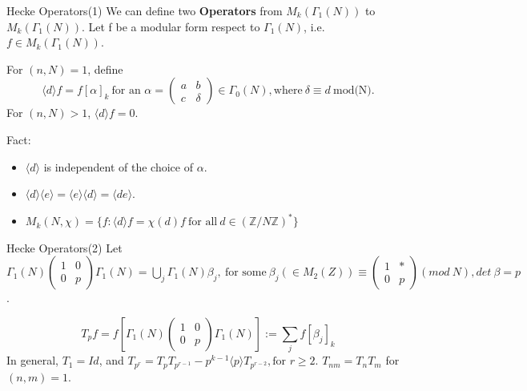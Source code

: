 \documentclass{beamer}
\theoremstyle{plain}
\theoremstyle{definition}
\theoremstyle{remark}
\newcommand{\Z}{\mathbb{Z}}
\begin{document}
\begin{frame}{Hecke Operators(1)}
    We can define two \textbf{Operators} from $M_k(\Gamma_1(N))$ to $ M_k(\Gamma_1(N))$.
    Let f be a modular form respect to $\Gamma_1(N)$, i.e. $f \in M_k(\Gamma_1(N))$.\pause
    \begin{definition}
        For $(n,N)=1$, define
        \[\langle d\rangle f=f[\alpha ]_k \ \text{for an } \alpha =\begin{pmatrix}
                a & b      \\
                c & \delta
            \end{pmatrix}\in \Gamma_0(N), \text{where} \ \delta \equiv  d \ \text{mod(N)}.\]
        For $(n,N)>1$, $\langle d\rangle f=0$.
    \end{definition}\pause
    Fact:
    \begin{itemize}
        \item $\langle d \rangle$ is independent of the choice of $\alpha$.
        \item $\langle d\rangle\langle e\rangle=\langle e\rangle\langle d\rangle=\langle de\rangle$.
        \item $M_k(N,\chi)=\{f: \langle d\rangle f=\chi(d)f \  \text{for all} \ d\in (\Z/N\Z)^* \}$
    \end{itemize}  
     
\end{frame}

\begin{frame}{Hecke Operators(2)}
    Let $\Gamma_1(N)\begin{pmatrix}
            1 & 0 \\
            0 & p
        \end{pmatrix}\Gamma_1(N)=\bigcup_j\Gamma_1(N) \beta_j, \ \text{for some}\  \beta_j(\in M_2(Z)) \equiv \begin{pmatrix}
            1 & * \\
            0 & p
        \end{pmatrix} (mod\  N), det \  \beta =p$.
    \begin{definition}[$T_p$]
        \[T_p f=f[\Gamma_1(N)\begin{pmatrix}
                1 & 0 \\
                0 & p
            \end{pmatrix}\Gamma_1(N)]:=\sum_jf[\beta_j]_k\]
        In general, $T_1=Id$, and $T_{p^r}=T_pT_{p^{r-1}}-p^{k-1}\langle p \rangle T_{p^{r-2}}, \text{for } r\ge2$.
        $T_{nm}=T_nT_m$ for $(n,m)=1$.
    \end{definition}
\end{frame}
\end{document}
